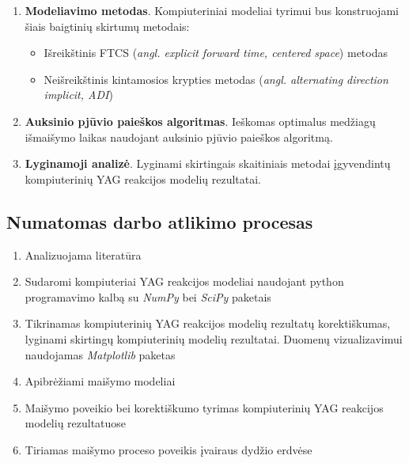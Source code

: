 \documentclass[]{VUMIFTemplateClass}
\begin{document}
\begin{enumerate}
    \item \textbf{Modeliavimo metodas}. Kompiuteriniai modeliai tyrimui bus konstruojami šiais baigtinių skirtumų metodais:
    \begin{itemize}
        \item Išreikštinis FTCS (\textit{angl. explicit forward time, centered space}) metodas
        \item Neišreikštinis kintamosios krypties metodas (\textit{angl. alternating direction implicit, ADI}) 
    \end{itemize}
    \item \textbf{Auksinio pjūvio paieškos algoritmas}. Ieškomas optimalus medžiagų išmaišymo laikas naudojant auksinio pjūvio paieškos algoritmą.
    \item \textbf{Lyginamoji analizė}. Lyginami skirtingais skaitiniais metodai įgyvendintų kompiuterinių YAG reakcijos modelių rezultatai. 
\end{enumerate}


\subsection{Numatomas darbo atlikimo procesas}

\begin{enumerate}
    \item Analizuojama literatūra 
    \item Sudaromi kompiuteriai YAG reakcijos modeliai naudojant python programavimo kalbą su \hbox{\textit{NumPy}} bei \textit{SciPy} paketais
    \item Tikrinamas kompiuterinių YAG reakcijos modelių rezultatų korektiškumas, lyginami skirtingų kompiuterinių modelių rezultatai. Duomenų vizualizavimui naudojamas \textit{Matplotlib} paketas
    \item Apibrėžiami maišymo modeliai
    \item Maišymo poveikio bei korektiškumo tyrimas kompiuterinių YAG reakcijos modelių rezultatuose 
    \item Tiriamas maišymo proceso poveikis įvairaus dydžio erdvėse
\end{enumerate}



\printbibliography[title = {Literatūra ir šaltiniai}]
\end{document}
